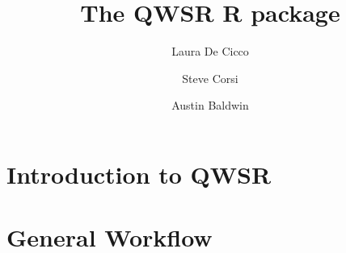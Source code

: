 \documentclass[a4paper,11pt]{article}\usepackage{graphicx, color}
\begin{document}
\title{The QWSR R package}
\author[1]{Laura De Cicco}
\author[1]{Steve Corsi}
\author[1]{Austin Baldwin}






\maketitle
\tableofcontents

\section{Introduction to QWSR}


\section{General Workflow}
\end{document}
